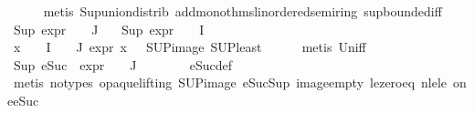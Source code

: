 \begin{isabellebody}
\ \ \ \ \isamarkupfalse%
\ {\isacharparenleft}{\kern0pt}metis\ Sup{\isacharunderscore}{\kern0pt}union{\isacharunderscore}{\kern0pt}distrib\ add{\isacharunderscore}{\kern0pt}mono{\isacharunderscore}{\kern0pt}thms{\isacharunderscore}{\kern0pt}linordered{\isacharunderscore}{\kern0pt}semiring{\isacharparenleft}{\kern0pt}{}{\isacharparenright}{\kern0pt}\ sup{\isachardot}{\kern0pt}bounded{\isacharunderscore}{\kern0pt}iff{\isacharparenright}{\kern0pt}\isanewline
\ \ \isamarkupfalse%
\ {\isachardoublequoteopen}Sup\ {\isacharparenleft}{\kern0pt}{\isacharparenleft}{\kern0pt}expr{\isacharunderscore}{\kern0pt}{}\ {\isasymcirc}\ {\isasymPhi}{\isacharparenright}{\kern0pt}\ {\isacharbackquote}{\kern0pt}\ J{\isacharparenright}{\kern0pt}\ {\isasymle}\ {}{\isachardoublequoteclose}\isanewline
{}\ {\isachardoublequoteopen}Sup\ {\isacharparenleft}{\kern0pt}{\isacharparenleft}{\kern0pt}expr{\isacharunderscore}{\kern0pt}{}\ {\isasymcirc}\ {\isasymPhi}{\isacharparenright}{\kern0pt}\ {\isacharbackquote}{\kern0pt}\ I{\isacharparenright}{\kern0pt}\ {\isasymle}\ {}{\isachardoublequoteclose}\isanewline
\ \ \ \ \isamarkupfalse%
\ {\isacartoucheopen}{\isasymforall}x\ {\isasymin}\ {\isasymPhi}\ {\isacharbackquote}{\kern0pt}\ I\ {\isasymunion}\ {\isasymPhi}\ {\isacharbackquote}{\kern0pt}\ J{\isachardot}{\kern0pt}\ expr{\isacharunderscore}{\kern0pt}{}\ x\ {\isacharless}{\kern0pt}{\isacharequal}{\kern0pt}\ {}{\isacartoucheclose}\ SUP{\isacharunderscore}{\kern0pt}image\ SUP{\isacharunderscore}{\kern0pt}least\isanewline
\ \ \ \ \isamarkupfalse%
\ {\isacharparenleft}{\kern0pt}metis\ Un{\isacharunderscore}{\kern0pt}iff{\isacharparenright}{\kern0pt}{\isacharplus}{\kern0pt}\isanewline
\ \ \isamarkupfalse%
\ {\isachardoublequoteopen}Sup\ {\isacharparenleft}{\kern0pt}{\isacharparenleft}{\kern0pt}eSuc\ {\isasymcirc}\ expr{\isacharunderscore}{\kern0pt}{}\ {\isasymcirc}\ {\isasymPhi}{\isacharparenright}{\kern0pt}\ {\isacharbackquote}{\kern0pt}\ J{\isacharparenright}{\kern0pt}\ {\isasymle}\ {}{\isachardoublequoteclose}\isanewline
\ \ \ \ \isamarkupfalse%
\ eSuc{\isacharunderscore}{\kern0pt}def\ \isanewline
\ \ \ \ \isamarkupfalse%
\ {\isacharparenleft}{\kern0pt}metis\ {\isacharparenleft}{\kern0pt}no{\isacharunderscore}{\kern0pt}types{\isacharcomma}{\kern0pt}\ opaque{\isacharunderscore}{\kern0pt}lifting{\isacharparenright}{\kern0pt}\ SUP{\isacharunderscore}{\kern0pt}image\ eSuc{\isacharunderscore}{\kern0pt}Sup\ image{\isacharunderscore}{\kern0pt}empty\ le{\isacharunderscore}{\kern0pt}zero{\isacharunderscore}{\kern0pt}eq\ nle{\isacharunderscore}{\kern0pt}le\ one{\isacharunderscore}{\kern0pt}eSuc{\isacharparenright}{\kern0pt}\isanewline

\end{isabellebody}
